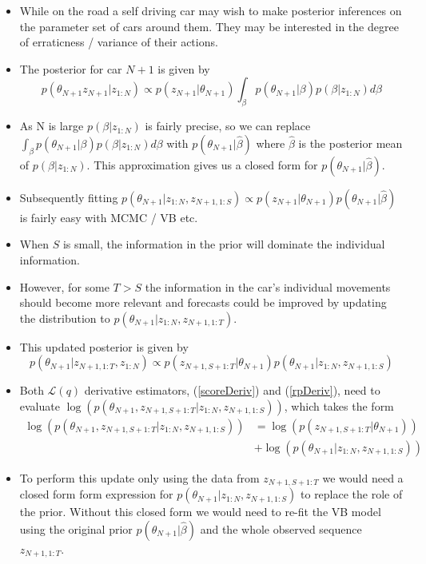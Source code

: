 \documentclass[12pt,a4paper]{article}\usepackage[]{graphicx}\usepackage[]{color}
\begin{document}
\begin{itemize}
\item While on the road a self driving car may wish to make posterior inferences on the parameter set of cars around them. They may be interested in the degree of erraticness / variance of their actions.
\item The posterior for car $N+1$ is given by 
\begin{equation}
\label{originalPost}
p(\theta_{N+1} z_{N+1} | z_{1:N}) \propto p(z_{N+1} | \theta_{N+1}) \int_{\beta} p(\theta_{N+1} | \beta) p (\beta | z_{1:N}) d\beta
\end{equation}
\item As N is large $p (\beta | z_{1:N})$ is fairly precise, so we can replace $\int_{\beta} p(\theta_{N+1} | \beta) p (\beta | z_{1:N}) d\beta$ with $ p(\theta_{N+1} | \hat{\beta})$ where $\hat{\beta}$ is the posterior mean of $p(\beta | z_{1:N})$. This approximation gives us a closed form for $ p(\theta_{N+1} | \hat{\beta})$.
\item Subsequently fitting $p(\theta_{N+1} | z_{1:N}, z_{N+1, 1:S})  \propto p(z_{N+1} | \theta_{N+1}) p(\theta_{N+1} | \hat{\beta})$ is fairly easy with MCMC / VB etc.
\item When $S$ is small, the information in the prior will dominate the individual information.
\item However, for some $T > S$ the information in the car's individual movements should become more relevant and forecasts could be improved by updating the distribution to $p(\theta_{N+1} | z_{1:N}, z_{N+1, 1:T})$.
\item This updated posterior is given by
\begin{equation}
\label{updatePost}
p(\theta_{N+1} | z_{N+1, 1:T}, z_{1:N}) \propto p(z_{N+1, S+1:T} | \theta_{N+1})p(\theta_{N+1} | z_{1:N}, z_{N+1, 1:S})
\end{equation}
\item Both $\mathcal{L}(q)$ derivative estimators, (\ref{scoreDeriv}) and (\ref{rpDeriv}), need to evaluate \newline $\log(p(\theta_{N+1}, z_{N+1, S+1:T} | z_{1:N}, z_{N+1, 1:S}))$, which takes the form
\begin{align}
\log(p(\theta_{N+1}, z_{N+1, S+1:T} | z_{1:N}, z_{N+1, 1:S})) &= \log(p(z_{N+1, S+1:T} | \theta_{N+1})) \nonumber \\
&+ \log(p(\theta_{N+1} | z_{1:N}, z_{N+1, 1:S})) \label{updateEq}
\end{align}
\item To perform this update only using the data from $z_{N+1, S+1:T}$ we would need a closed form form expression for $p(\theta_{N+1} | z_{1:N}, z_{N+1, 1:S})$ to replace the role of the prior. Without this closed form we would need to re-fit the VB model using the original prior $p(\theta_{N+1} | \hat{\beta})$ and the whole observed sequence $z_{N+1, 1:T}$.

\end{itemize}
\end{document}
